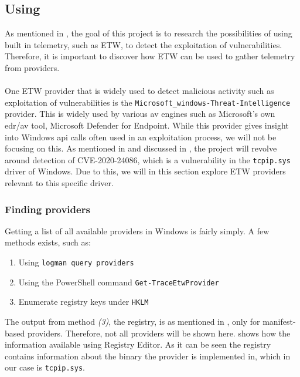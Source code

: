 \documentclass{report}
\begin{document}
\subsection{Using }
\label{cha:etw:constructing-trace-session}
As mentioned in , the goal of this project is to research the possibilities of using built in telemetry, such as \gls{ETW}, to detect the exploitation of vulnerabilities. Therefore, it is important to discover how \gls{ETW} can be used to gather telemetry from providers.
\\
\\
One \gls{ETW} provider that is widely used to detect malicious activity such as exploitation of vulnerabilities is the \texttt{Microsoft_windows-Threat-Intelligence}\cite{url:etw:etwti} provider. This is widely used by various \gls{av} engines such as Microsoft's own \gls{edr}/\gls{av} tool, Microsoft Defender for Endpoint. While this provider gives insight into Windows \gls{api} calls often used in an exploitation process, we will not be focusing on this. As mentioned in  and discussed in , the project will revolve around detection of CVE-2020-24086, which is a vulnerability in the \texttt{tcpip.sys} driver of Windows. Due to this, we will in this section explore \gls{ETW} providers relevant to this specific driver.

\subsubsection{Finding providers}
Getting a list of all available providers in Windows is fairly simply. A few methods exists, such as:

\begin{enumerate}
    \item Using \texttt{logman query providers}
    \item Using the PowerShell command \texttt{Get-TraceEtwProvider}
    \item Enumerate registry keys under \texttt{HKLM\SOFTWARE\Microsoft\Windows\CurrentVersion\WINEVT\Publishers}
\end{enumerate}

The output from method \emph{(3)}, the registry, is as mentioned in , only for manifest-based providers. Therefore, not all providers will be shown here.  shows how the information available using Registry Editor. As it can be seen the registry contains information about the binary the provider is implemented in, which in our case is \texttt{tcpip.sys}. 
\end{document}
